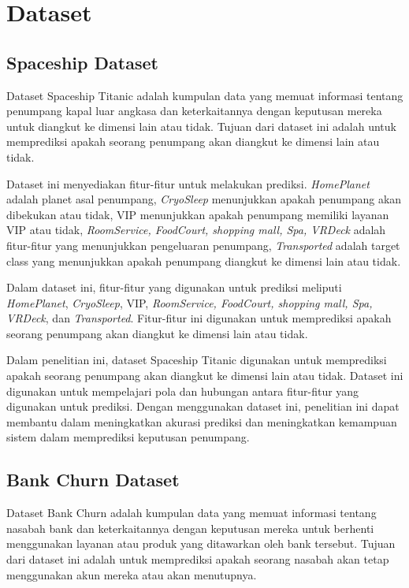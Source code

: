 \documentclass[conference]{IEEEtran}
\begin{document}
\section{Dataset}

\subsection{Spaceship Dataset}
Dataset Spaceship Titanic adalah kumpulan data yang memuat informasi tentang penumpang kapal luar angkasa dan keterkaitannya dengan keputusan mereka untuk diangkut ke dimensi lain atau tidak. 
Tujuan dari dataset ini adalah untuk memprediksi apakah seorang penumpang akan diangkut ke dimensi lain atau tidak.

Dataset ini menyediakan fitur-fitur untuk melakukan prediksi. \textit{HomePlanet} adalah planet asal penumpang, \textit{CryoSleep} menunjukkan apakah penumpang akan dibekukan atau tidak, 
VIP menunjukkan apakah penumpang memiliki layanan VIP atau tidak, \textit{RoomService, FoodCourt, shopping mall, Spa, VRDeck} adalah fitur-fitur yang menunjukkan pengeluaran penumpang, 
\textit{Transported} adalah target class yang menunjukkan apakah penumpang diangkut ke dimensi lain atau tidak.

Dalam dataset ini, fitur-fitur yang digunakan untuk prediksi meliputi \textit{HomePlanet}, \textit{CryoSleep}, VIP, \textit{RoomService, FoodCourt, shopping mall, Spa, VRDeck}, dan \textit{Transported}. Fitur-fitur ini 
digunakan untuk memprediksi apakah seorang penumpang akan diangkut ke dimensi lain atau tidak. 

Dalam penelitian ini, dataset Spaceship Titanic digunakan untuk memprediksi apakah seorang penumpang akan diangkut ke dimensi lain atau tidak. Dataset ini digunakan untuk mempelajari 
pola dan hubungan antara fitur-fitur yang digunakan untuk prediksi. Dengan menggunakan dataset ini, penelitian ini dapat membantu dalam meningkatkan akurasi prediksi dan meningkatkan 
kemampuan sistem dalam memprediksi keputusan penumpang.

\subsection{Bank Churn Dataset}
Dataset Bank Churn adalah kumpulan data yang memuat informasi tentang nasabah bank dan keterkaitannya dengan keputusan mereka untuk berhenti menggunakan layanan atau produk yang ditawarkan oleh bank tersebut. 
Tujuan dari dataset ini adalah untuk memprediksi apakah seorang nasabah akan tetap menggunakan akun mereka atau akan menutupnya.
\end{document}
